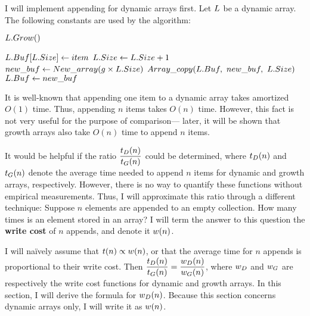 \HdrDynArrayImpl

I will implement appending for dynamic arrays first. Let $\VarList$ be a dynamic array. The following constants are used by the algorithm:

\begin{algorithm}
	\begin{algorithmic}[1]
		\Procedure{$\FuncAppend$}{$\VarList,\ \ParamItem$}
				\State $L.Grow()$
			\EndIf
			
			\State $L.Buf[L.Size] \gets item$
			\State $L.Size \gets L.Size + 1$
		\EndProcedure
		\Statex
		\Procedure{$\FuncGrow$}{$\VarList$}
			\State $new\_buf \gets New\_array(g \times L.Size)$
			\State $\FuncArrayCopy(\VarList.\FieldBuffer,\ \LclNewBuffer,\ \VarList.\FieldSize)$
			\State $L.Buf \gets new\_buf$
		\EndProcedure
	\end{algorithmic}
\end{algorithm}

\HdrTimeComplex

It is well-known that appending one item to a dynamic array takes amortized $O(1)$ time. Thus, appending $n$ items takes $O(n)$ time. However, this fact is not very useful for the purpose of comparison--- later, it will be shown that growth arrays also take $O(n)$ time to append $n$ items.

It would be helpful if the ratio $\dfrac{t_D(n)}{t_G(n)}$ could be determined, where $t_D(n)$ and $t_G(n)$ denote the average time needed to append $n$ items for dynamic and growth arrays, respectively. However, there is no way to quantify these functions without empirical measurements. Thus, I will approximate this ratio through a different technique: Suppose $n$ elements are appended to an empty collection. How many times is an element stored in an array? I will term the answer to this question the \textbf{write cost} of $n$ appends, and denote it $w(n)$.

I will na\"{i}vely assume that $t(n) \propto w(n)$, or that the average time for $n$ appends is proportional to their write cost. Then $\dfrac{t_D(n)}{t_G(n)} = \dfrac{w_D(n)}{w_G(n)}$, where $w_D$ and $w_G$ are respectively the write cost functions for dynamic and growth arrays. In this section, I will derive the formula for $w_D(n)$. Because this section concerns dynamic arrays only, I will write it as $w(n)$.

